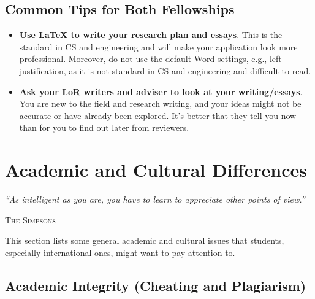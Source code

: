 \documentclass[oneside,11pt,dvipsnames]{book}
\newcommand{\myepigraphsimpsons}[1]{
\epigraph{\vspace{-0.2in} \emph{#1}}{\textsc{The Simpsons}}
}
\begin{document}
\section{Common Tips for Both Fellowships}

\begin{itemize}
  \item \textbf{Use LaTeX to write your research plan and essays}.  This is the standard in CS and engineering and will make your application look more professional.  Moreover, do not use the default Word settings, e.g., left justification, as it is not standard in CS and engineering and difficult to read.  

  \item \textbf{Ask your LoR writers and adviser to look at your writing/essays}. You are new to the field and research writing, and your ideas might not be accurate or have already been explored. It's better that they tell you now than for you to find out later from reviewers.
\end{itemize}










\chapter{Academic and Cultural Differences}\label{chap:cultural}

\myepigraphsimpsons{``As intelligent as you are, you have to learn to appreciate other points of view.''}

This section lists some general academic and cultural issues that students, especially international ones, might want to pay attention to.


\section{Academic Integrity (Cheating and Plagiarism)}
\end{document}
